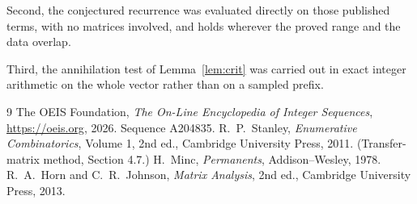 \documentclass[11pt,a4paper]{article}
\theoremstyle{plain}
\theoremstyle{definition}
\begin{document}
Second, the conjectured recurrence was evaluated directly on those published terms, with no
matrices involved, and holds wherever the proved range and the data overlap.

Third, the annihilation test of Lemma~\ref{lem:crit} was carried out in exact integer
arithmetic on the whole vector rather than on a sampled prefix.

\begin{thebibliography}{9}
 The OEIS Foundation, \emph{The On-Line Encyclopedia of Integer
Sequences}, \url{https://oeis.org}, 2026. Sequence A204835.
 R.~P.~Stanley, \emph{Enumerative Combinatorics}, Volume 1, 2nd ed.,
Cambridge University Press, 2011. (Transfer-matrix method, Section 4.7.)
 H.~Minc, \emph{Permanents}, Addison--Wesley, 1978.
 R.~A.~Horn and C.~R.~Johnson, \emph{Matrix Analysis}, 2nd ed., Cambridge
University Press, 2013.
\end{thebibliography}
\end{document}
